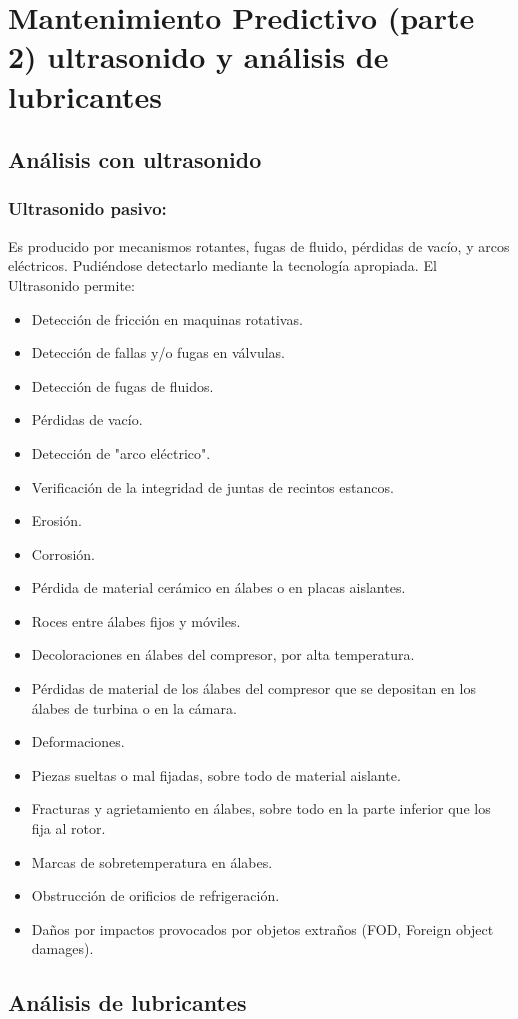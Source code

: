 \documentclass[../main]{subfiles}
\begin{document}
\section{Mantenimiento Predictivo (parte 2) ultrasonido y análisis de lubricantes}

\subsection{Análisis con ultrasonido}
\subsubsection{Ultrasonido pasivo:}
Es producido por mecanismos rotantes, fugas de fluido, pérdidas de vacío, y arcos eléctricos. Pudiéndose detectarlo mediante la tecnología apropiada.
El Ultrasonido permite:
\begin{itemize}
\item Detección de fricción en maquinas rotativas.
\item Detección de fallas y/o fugas en válvulas.
\item Detección de fugas de fluidos.
\item Pérdidas de vacío.
\item Detección de "arco eléctrico".
\item Verificación de la integridad de juntas de recintos estancos.
\item Erosión.
\item Corrosión.
\item Pérdida de material cerámico en álabes o en placas aislantes.
\item Roces entre álabes fijos y móviles.
\item Decoloraciones en álabes del compresor, por alta temperatura.
\item Pérdidas de material de los álabes del compresor que se depositan en los álabes de turbina o en la cámara.
\item Deformaciones.
\item Piezas sueltas o mal fijadas, sobre todo de material aislante.
\item Fracturas y agrietamiento en álabes, sobre todo en la parte inferior que los fija al rotor.
\item Marcas de sobretemperatura en álabes.
\item Obstrucción de orificios de refrigeración.
\item Daños por impactos provocados por objetos extraños (FOD, Foreign object damages).

\end{itemize}
\subsection{Análisis de lubricantes}
\end{document}
